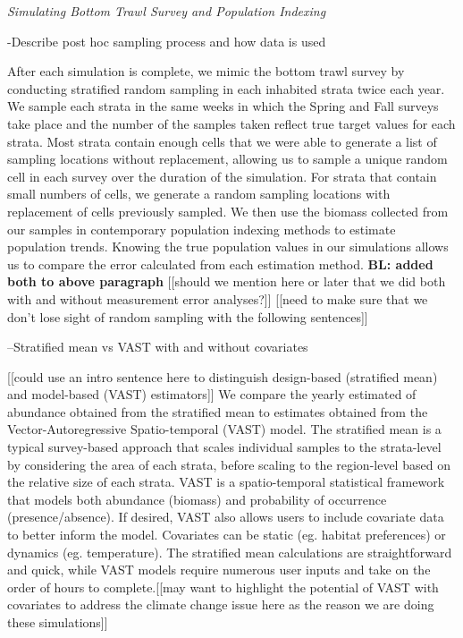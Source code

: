 \documentclass[
  12pt,
]{article}
\begin{document}
\emph{Simulating Bottom Trawl Survey and Population Indexing}

-Describe post hoc sampling process and how data is used

After each simulation is complete, we mimic the bottom trawl survey by conducting stratified random sampling in each inhabited strata twice each year. We sample each strata in the same weeks in which the Spring and Fall surveys take place and the number of the samples taken reflect true target values for each strata. Most strata contain enough cells that we were able to generate a list of sampling locations without replacement, allowing us to sample a unique random cell in each survey over the duration of the simulation. For strata that contain small numbers of cells, we generate a random sampling locations with replacement of cells previously sampled. We then use the biomass collected from our samples in contemporary population indexing methods to estimate population trends. Knowing the true population values in our simulations allows us to compare the error calculated from each estimation method.
\textbf{BL: added both to above paragraph}
{[}{[}should we mention here or later that we did both with and without measurement error analyses?{]}{]}
{[}{[}need to make sure that we don't lose sight of random sampling with the following sentences{]}{]}

--Stratified mean vs VAST with and without covariates

{[}{[}could use an intro sentence here to distinguish design-based (stratified mean) and model-based (VAST) estimators{]}{]} We compare the yearly estimated of abundance obtained from the stratified mean to estimates obtained from the Vector-Autoregressive Spatio-temporal (VAST) model. The stratified mean is a typical survey-based approach that scales individual samples to the strata-level by considering the area of each strata, before scaling to the region-level based on the relative size of each strata. VAST is a spatio-temporal statistical framework that models both abundance (biomass) and probability of occurrence (presence/absence). If desired, VAST also allows users to include covariate data to better inform the model. Covariates can be static (eg. habitat preferences) or dynamics (eg. temperature). The stratified mean calculations are straightforward and quick, while VAST models require numerous user inputs and take on the order of hours to complete.{[}{[}may want to highlight the potential of VAST with covariates to address the climate change issue here as the reason we are doing these simulations{]}{]}
\end{document}

